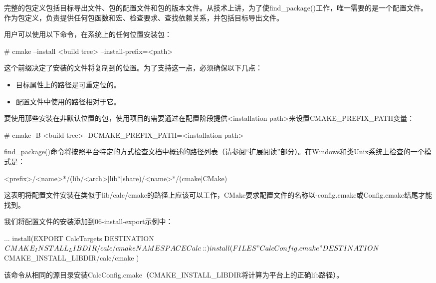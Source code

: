 
完整的包定义包括目标导出文件、包的配置文件和包的版本文件。从技术上讲，为了使find\_package()工作，唯一需要的是一个配置文件。作为包定义，负责提供任何包函数和宏、检查要求、查找依赖关系，并包括目标导出文件。

用户可以使用以下命令，在系统上的任何位置安装包：

\begin{shell}
# cmake --install <build tree> --install-prefix=<path>
\end{shell}

这个前缀决定了安装的文件将复制到的位置。为了支持这一点，必须确保以下几点：

\begin{itemize}
\item
目标属性上的路径是可重定位的。

\item
配置文件中使用的路径相对于它。
\end{itemize}

要使用那些安装在非默认位置的包，使用项目的需要通过在配置阶段提供<installation path>来设置CMAKE\_PREFIX\_PATH变量：

\begin{shell}
# cmake -B <build tree> -DCMAKE_PREFIX_PATH=<installation path>
\end{shell}

find\_package()命令将按照平台特定的方式检查文档中概述的路径列表（请参阅“扩展阅读”部分）。在Windows和类Unix系统上检查的一个模式是：

\begin{shell}
<prefix>/<name>*/(lib/<arch>|lib*|share)/<name>*/(cmake|CMake)
\end{shell}

这表明将配置文件安装在类似于lib/calc/cmake的路径上应该可以工作，CMake要求配置文件的名称以-config.cmake或Config.cmake结尾才能找到。

我们将配置文件的安装添加到06-install-export示例中：


\begin{cmake}
...
install(EXPORT CalcTargets
    DESTINATION ${CMAKE_INSTALL_LIBDIR}/calc/cmake
    NAMESPACE Calc::
)
install(FILES "CalcConfig.cmake"
    DESTINATION ${CMAKE_INSTALL_LIBDIR}/calc/cmake
)
\end{cmake}

该命令从相同的源目录安装CalcConfig.cmake（CMAKE\_INSTALL\_LIBDIR将计算为平台上的正确lib路径）。

